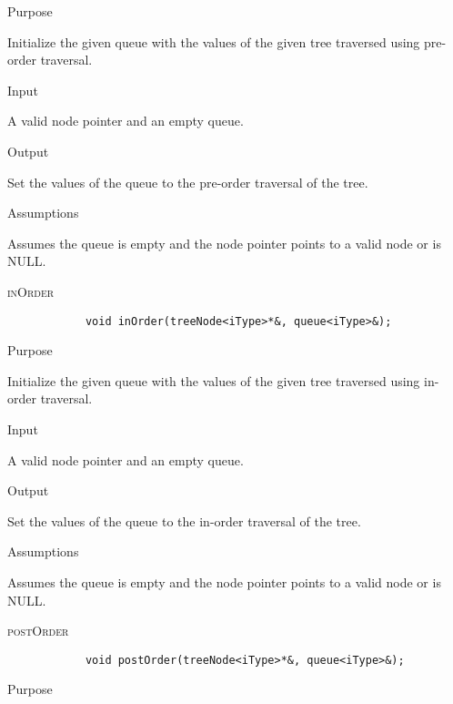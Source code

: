 \documentclass[pdftex, 12pt]{article}
\begin{document}
\begin{description}
\begin{description}
			\item{Purpose}
				
				Initialize the given queue with the values of the given tree traversed using pre-order traversal.

			\item{Input}

				A valid node pointer and an empty queue.

			\item{Output}

				Set the values of the queue to the pre-order traversal of the tree.

			\item{Assumptions}

				Assumes the queue is empty and the node pointer points to a valid node or is NULL.

		\end{description}
	\item{\textsc{inOrder}}
		\begin{lstlisting}
			void inOrder(treeNode<iType>*&, queue<iType>&);
		\end{lstlisting}
		\begin{description}

		\item{Purpose}
			
			Initialize the given queue with the values of the given tree traversed using in-order traversal.

		\item{Input}

			A valid node pointer and an empty queue.

		\item{Output}

			Set the values of the queue to the in-order traversal of the tree.

		\item{Assumptions}

			Assumes the queue is empty and the node pointer points to a valid node or is NULL.

		\end{description}
	\item{\textsc{postOrder}}
		\begin{lstlisting}
			void postOrder(treeNode<iType>*&, queue<iType>&);
		\end{lstlisting}
		\begin{description}

		\item{Purpose}
			

\end{description}
\end{description}
\end{document}
